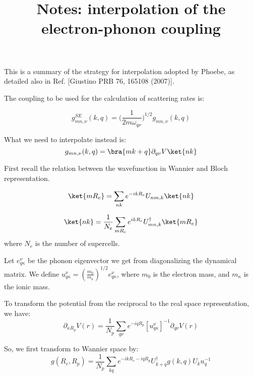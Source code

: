 \documentclass[singlecolumn,english,aps,prl,showpacs,floatfix,superscriptaddress,notitlepage]{revtex4-1}
\begin{document}
\title{Notes: interpolation of the electron-phonon coupling}

\maketitle

This is a summary of the strategy for interpolation adopted by Phoebe, as detailed also in Ref. [Giustino PRB  76, 165108 (2007)].

The coupling to be used for the calculation of scattering rates is:

\begin{equation}
g^{SE}_{mn,\nu} (k,q) = \bigg( \frac{1}{2 m \omega_{q\nu}} \bigg)^{1/2} g_{mn,\nu} (k,q)
\end{equation}

What we need to interpolate instead is:
\begin{equation}
g_{mn,\nu} (k,q) = \bra{mk+q} \partial_{q\nu}V \ket{nk}
\end{equation}

First recall the relation between the wavefunction in Wannier and Bloch representation.

\begin{equation}
\ket{mR_e} = \sum_{nk} e^{-ikR_e} U_{nm,k} \ket{nk}
\end{equation}

\begin{equation}
\ket{nk} = \frac{1}{N_e} \sum_{mR_e} e^{ikR_e} U_{mn,k}^\dagger \ket{mR_e}
\end{equation}
where $N_e$ is the number of supercells.



Let $e_{q\kappa}^{\nu}$ be the phonon eigenvector we get from diagonalizing the dynamical matrix.
We define $u_{q\kappa}^{\nu} = (\frac{m_0}{m_{\kappa}})^{1/2} e_{q\kappa}^{\nu}$, where $m_0$ is the electron mass, and $m_{\kappa}$ is the ionic mass.

To transform the potential from the reciprocal to the real space representation, we have:
\begin{equation}
\partial_{\kappa R_p} V(r)
=
\frac{1}{N_p}
\sum_{q\nu} e^{-iqR_p} [u_{q\kappa}^{\nu}]^{-1} \partial_{q\nu} V(r)
\end{equation}


So, we first transform to Wannier space by:
\begin{equation}
g(R_e,R_p)
=
\frac{1}{N_p}
\sum_{kq} e^{-ikR_e-iqR_p} U_{k+q}^\dagger g(k,q) U_k u_q^{-1}
\end{equation}
\end{document}
